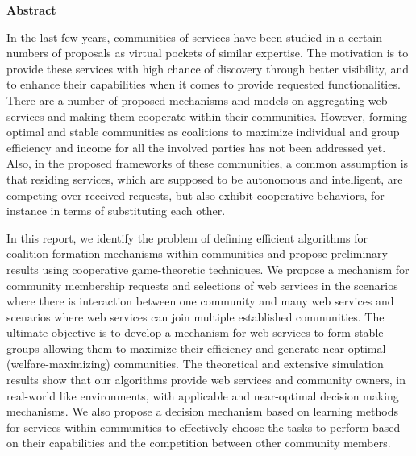 \begin{center}
{\LARGE\textbf{Abstract}}
\end{center}

In the last few years, communities of services have been studied in a certain numbers of proposals as virtual pockets of similar expertise. The motivation is to provide these services with high chance of discovery through better visibility, and to enhance their capabilities when it comes to provide requested functionalities. There are a number of proposed mechanisms and models on aggregating web services and making them cooperate within their communities. However, forming optimal and stable communities as coalitions to maximize individual and group efficiency and income for all the involved parties has not been addressed yet. Also, in the proposed frameworks of these communities, a common assumption is that residing services, which are supposed to be autonomous and intelligent, are competing over received requests, but also exhibit cooperative behaviors, for instance in terms of substituting each other.

In this report, we identify the problem of defining efficient algorithms for coalition formation mechanisms within communities and propose preliminary results using cooperative game-theoretic techniques. We propose a mechanism for community membership requests and selections of web services in the scenarios where there is interaction between one community and many web services and scenarios where web services can join multiple established communities. The ultimate objective is to develop a mechanism for web services to form stable groups allowing them to maximize their efficiency and generate near-optimal (welfare-maximizing) communities. The theoretical and extensive simulation results show that our algorithms provide web services and community owners, in real-world like environments, with applicable and near-optimal decision making mechanisms. We also propose a decision mechanism based on learning methods for services within communities to effectively choose the tasks to perform based on their capabilities and the competition between other community members.
























